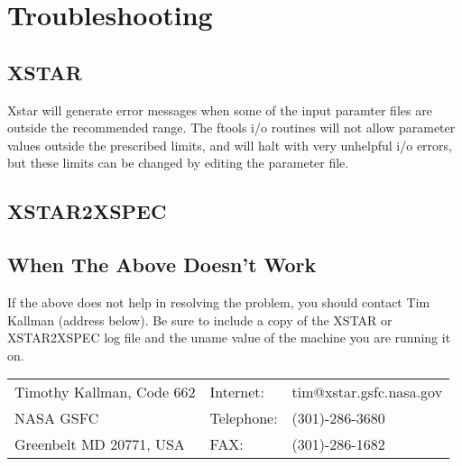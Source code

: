 \chapter{Troubleshooting}
\label{sec:troubleshooting}


\section{XSTAR}

Xstar will generate error messages when some of the input paramter files are outside the recommended 
range.  The ftools i/o routines will not allow parameter values outside the prescribed limits, and will 
halt with very unhelpful i/o errors,  but these limits can be changed by editing the parameter file.  

\section{XSTAR2XSPEC}


\section{When The Above Doesn't Work}

If the above does not help in resolving the problem, you should 
contact Tim Kallman (address below).  Be sure to include a copy of 
the XSTAR or XSTAR2XSPEC log file and the uname value of the machine 
you are running it on.

\begin{tabular}{lll}
	Timothy Kallman, Code 662  & Internet: & tim@xstar.gsfc.nasa.gov  \\
	NASA GSFC & Telephone: & (301)-286-3680  \\
	Greenbelt MD 20771, USA  & FAX: &  (301)-286-1682  \\
\end{tabular}
